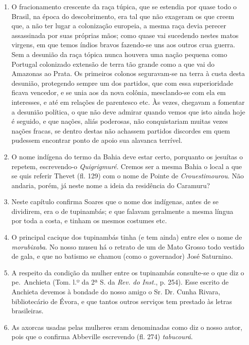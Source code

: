\begin{enumerate}
\item  O fracionamento crescente da raça túpica, que se estendia por
quase todo o Brasil, na época do descobrimento, era tal que não exageram
os que creem que, a não ter lugar a colonização europeia, a mesma raça devia
perecer assassinada por suas próprias mãos; como quase vai sucedendo nestes
matos virgens, em que temos índios bravos fazendo-se uns aos outros crua
guerra. Sem a desunião da raça tópica nunca houvera uma nação pequena
como Portugal colonizado extensão de terra tão grande como a que vai do
Amazonas ao Prata. Os primeiros colonos seguravam-se na terra à custa
desta desunião, protegendo sempre um dos partidos, que com essa superioridade 
ficava vencedor, e se unia aos da nova colônia, mesclando-se com ela
em interesses, e até em relações de parentesco etc. Às vezes, chegavam a
fomentar a desunião política, o que não deve admirar quando vemos que isto ainda 
hoje é seguido, e que nações, aliás poderosas, não conquistariam muitas vezes nações 
fracas, se dentro destas não achassem partidos discordes em quem pudessem encontrar ponto 
de apoio sua alavanca terrível.

\item O nome indígena do termo da Bahia deve estar certo, porquanto os jesuítas o 
repetem, escrevendo-o \textit{Quigrigmuré}. Cremos ser a mesma Bahia o local a que se 
quis referir Thevet (fl. 129) com o nome de Pointe de \textit{Crouestimourou}. Não andaria, 
porém, já neste nome a ideia da residência do Caramuru?

\item Neste capítulo confirma Soares que o nome dos indígenas, antes de se dividirem, 
era o de tupinambás; e que falavam geralmente a mesma língua por toda a costa, e 
tinham os mesmos costumes etc.

\item O principal cacique dos tupinambás tinha (e tem ainda) entre eles o nome de 
\textit{morubixaba}. No nosso museu há o retrato de um de Mato Grosso todo vestido de gala, 
e que no batismo se chamou (como o governador) José Saturnino.

\item A respeito da condição da mulher entre os tupinambás consulte-se o que diz o 
pe.~Anchieta (Tom. l.º da 2ª S. da \textit{Rev. do Inst.}, p. 254). Esse escrito de Anchieta devemos 
à bondade do nosso amigo o Sr. Dr. Cunha Rivara, bibliotecário de Évora, e que tantos 
outros serviços tem prestado às letras brasileiras.

\item As axorcas usadas pelas mulheres eram denominadas como diz o nosso autor, pois 
que o confirma Abbeville escrevendo (fl. 274) \textit{tabucourá}.


\end{enumerate}
